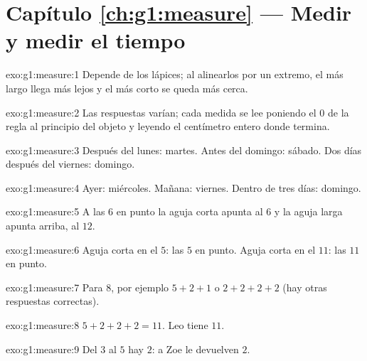 \section*{Capítulo \ref{ch:g1:measure} --- Medir y medir el tiempo}

\begin{solution}{exo:g1:measure:1}
Depende de los lápices; al alinearlos por un extremo, el más largo llega
más lejos y el más corto se queda más cerca.
\end{solution}

\begin{solution}{exo:g1:measure:2}
Las respuestas varían; cada medida se lee poniendo el $0$ de la regla al principio
del objeto y leyendo el centímetro entero donde termina.
\end{solution}

\begin{solution}{exo:g1:measure:3}
Después del lunes: martes. Antes del domingo: sábado. Dos días después del
viernes: domingo.
\end{solution}

\begin{solution}{exo:g1:measure:4}
Ayer: miércoles. Mañana: viernes. Dentro de tres días: domingo.
\end{solution}

\begin{solution}{exo:g1:measure:5}
A las $6$ en punto la aguja corta apunta al $6$ y la aguja larga
apunta arriba, al $12$.
\end{solution}

\begin{solution}{exo:g1:measure:6}
Aguja corta en el $5$: las $5$ en punto. Aguja corta en el $11$: las $11$ en punto.
\end{solution}

\begin{solution}{exo:g1:measure:7}
Para $8$, por ejemplo $5 + 2 + 1$ o $2 + 2 + 2 + 2$ (hay otras respuestas
correctas).
\end{solution}

\begin{solution}{exo:g1:measure:8}
$5 + 2 + 2 + 2 = 11$. Leo tiene $11$.
\end{solution}

\begin{solution}{exo:g1:measure:9}
Del $3$ al $5$ hay $2$: a Zoe le devuelven $2$.
\end{solution}
